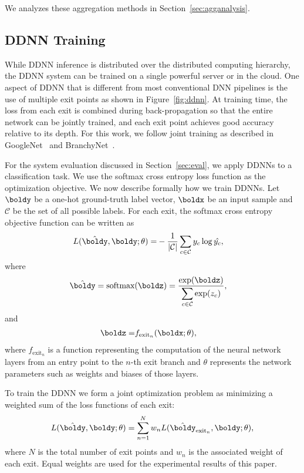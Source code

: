 \documentclass[10pt, conference, compsocconf]{IEEEtran}
\newcommand{\eg}{\emph{e.g.}}
\begin{document}
We analyzes these aggregation methods in Section~\ref{sec:agganalysis}.

\subsection{DDNN Training}
\label{sec:training}
While DDNN inference is distributed over the distributed computing hierarchy, the DDNN system can be trained on a single powerful server or in the cloud. One aspect of DDNN that is different from most conventional DNN pipelines is the use of multiple exit points as shown in Figure~\ref{fig:ddnn}. At training time, the loss from each exit is combined during back-propagation so that the entire network can be jointly trained, and each exit point achieves good accuracy relative to its depth. For this work, we follow joint training as described in GoogleNet~\cite{szegedy2015going} and BranchyNet~\cite{teerapittayanon2016branchynet}.

For the system evaluation discussed in Section~\ref{sec:eval}, we apply DDNNs to a classification task. We use the softmax cross entropy loss function as the optimization objective. We now describe formally how we train DDNNs. Let $\boldy$ be a one-hot ground-truth label vector, $\boldx$ be an input sample and $\mathcal C$ be the set of all possible labels. For each exit, the softmax cross entropy objective function can be written as
\begin{align*}
L(\hat{\boldy}, \boldy;\theta) = 
&-\frac{1}{|\mathcal C|} \displaystyle \sum_{c\in \mathcal C} y_c \log \hat{y_c},
\end{align*}
where 
\begin{align*}
\hat{\boldy}
&= \text{softmax}(\boldz) 
= \frac{\exp(\boldz)}{\displaystyle \sum_{c\in \mathcal C} \exp(z_c)},
\end{align*}
and
\begin{align*}
\boldz =
& f_{\text{exit}_n}(\boldx;\theta),
\end{align*}
where $f_{\text{exit}_n}$ is a function representing the computation of the neural network layers from an entry point to the $n$-th exit branch and $\theta$ represents the network parameters such as weights and biases of those layers.

To train the DDNN we form a joint optimization problem as minimizing a weighted sum of the loss functions of each exit:
\begin{align*}
    L(\hat{\boldy}, \boldy;\theta) = \displaystyle \sum_{n=1}^N w_n L(\hat{\boldy}_{\text{exit}_n}, \boldy;\theta),
\end{align*}
where $N$ is the total number of exit points and $w_n$ is the associated weight of each exit. Equal weights are used for the experimental results of this paper. %
\end{document}
